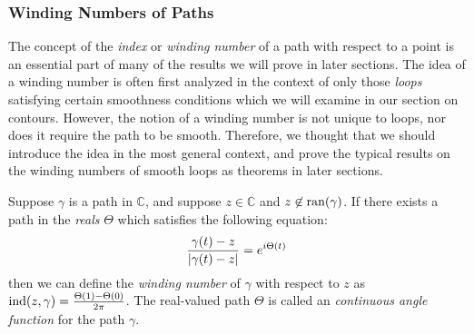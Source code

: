 \subsubsection{Winding Numbers of Paths}
The concept of the \emph{index} or \emph{winding number} of a path with respect to a point is an essential part of many of the results we will prove in later sections. The idea of a winding number is often first analyzed in the context of only those \emph{loops} satisfying certain smoothness conditions which we will examine in our section on contours. However, the notion of a winding number is not unique to loops, nor does it require the path to be smooth. Therefore, we thought that we should introduce the idea in the most general context, and prove the typical results on the winding numbers of smooth loops as theorems in later sections.
\begin{definition}
Suppose $\gamma$ is a path in $\mathbb{C}$, and suppose $z \in \mathbb{C}$ and $z \not\in \operatorname{ran}({\gamma})$. If there exists a path in the \emph{reals} $\Theta$ which satisfies the following equation:
\begin{equation*}
\frac{\gamma(t)-z}{\left\lvert \gamma(t)-z \right\rvert} = e^{i\Theta(t)}
\end{equation*}
then we can define the \emph{winding number} of $\gamma$ with respect to $z$ as $\operatorname{ind}({z},{\gamma}) = \frac{\Theta(1)-\Theta(0)}{2\pi}$. The real-valued path $\Theta$ is called an \emph{continuous angle function} for the path $\gamma$.
\end{definition}